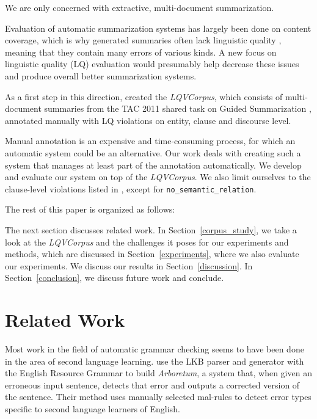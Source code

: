 \documentclass[a4paper,10pt]{scrartcl}
\theoremstyle{style}
\begin{document}
We are only concerned with extractive, multi-document summarization.

Evaluation of automatic summarization systems has largely been done on content coverage, which is why generated summaries often lack linguistic quality \citep{nenkova2011foundations}, meaning that they contain many errors of various kinds. A new focus on linguistic quality (LQ) evaluation would presumably help decrease these issues and produce overall better summarization systems.

As a first step in this direction, \cite{friedrichlqvsumm} created the \textit{LQVCorpus}, which consists of multi-document summaries from the TAC 2011 shared task on Guided Summarization \citep{owczarzak2011overview}, annotated manually with LQ violations on entity, clause and discourse level.

Manual annotation is an expensive and time-consuming process, for which an automatic system could be an alternative. Our work deals with creating such a system that manages at least part of the annotation automatically. We develop and evaluate our system on top of the \textit{LQVCorpus}. We also limit ourselves to the clause-level violations listed in \cite{friedrichlqvsumm}, except for \texttt{no\_semantic\_relation}.

The rest of this paper is organized as follows:

The next section discusses related work. In Section~\ref{corpus_study}, we take a look at the \textit{LQVCorpus} and the challenges it poses for our experiments and methods, which are discussed in Section~\ref{experiments}, where we also evaluate our experiments. We discuss our results in Section~\ref{discussion}. In Section~\ref{conclusion}, we discuss future work and conclude.

\section{Related Work}
\label{related_work}

Most work in the field of automatic grammar checking seems to have been done in the area of second language learning.
\cite{bender2004arboretum} use the LKB parser and generator \cite{copestake2002implementing} with the English Resource Grammar \citep{flickinger2000building} to build \textit{Arboretum}, a system that, when given an erroneous input sentence, detects that error and outputs a corrected version of the sentence. Their method uses manually selected mal-rules \citep{schneider1998recognizing} to detect error types specific to second language learners of English.
\end{document}
